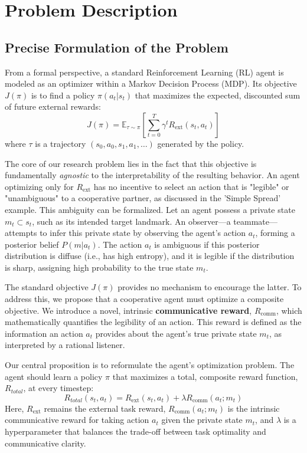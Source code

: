 \documentclass[12pt, a4paper]{report}
\newcommand{\Rcomm}{R_{\text{comm}}}
\newcommand{\Rext}{R_{\text{ext}}}
\begin{document}
\chapter{Problem Description}

\section{Precise Formulation of the Problem}
From a formal perspective, a standard Reinforcement Learning (RL) agent is modeled as an optimizer within a Markov Decision Process (MDP). Its objective $J(\pi)$ is to find a policy $\pi(a_t | s_t)$ that maximizes the expected, discounted sum of future external rewards:
$$ J(\pi) = \mathbb{E}_{\tau \sim \pi} \left[ \sum_{t=0}^T \gamma^t \Rext(s_t, a_t) \right] $$
where $\tau$ is a trajectory $(s_0, a_0, s_1, a_1, \dots)$ generated by the policy.

The core of our research problem lies in the fact that this objective is fundamentally \textit{agnostic} to the interpretability of the resulting behavior. An agent optimizing only for $\Rext$ has no incentive to select an action that is "legible" or "unambiguous" to a cooperative partner, as discussed in the 'Simple Spread' example. This ambiguity can be formalized. Let an agent possess a private state $m_t \subset s_t$, such as its intended target landmark. An observer---a teammate---attempts to infer this private state by observing the agent's action $a_t$, forming a posterior belief $P(m | a_t)$. The action $a_t$ is ambiguous if this posterior distribution is diffuse (i.e., has high entropy), and it is legible if the distribution is sharp, assigning high probability to the true state $m_t$.

The standard objective $J(\pi)$ provides no mechanism to encourage the latter. To address this, we propose that a cooperative agent must optimize a composite objective. We introduce a novel, intrinsic \textbf{communicative reward}, $\Rcomm$, which mathematically quantifies the legibility of an action. This reward is defined as the information an action $a_t$ provides about the agent's true private state $m_t$, as interpreted by a rational listener.

Our central proposition is to reformulate the agent's optimization problem. The agent should learn a policy $\pi$ that maximizes a total, composite reward function, $R_{total}$, at every timestep:
$$ R_{total}(s_{t},a_{t}) = \Rext(s_{t},a_{t}) + \lambda \Rcomm(a_t; m_t) $$
Here, $\Rext$ remains the external task reward, $\Rcomm(a_t; m_t)$ is the intrinsic communicative reward for taking action $a_t$ given the private state $m_t$, and $\lambda$ is a hyperparameter that balances the trade-off between task optimality and communicative clarity.
\end{document}
